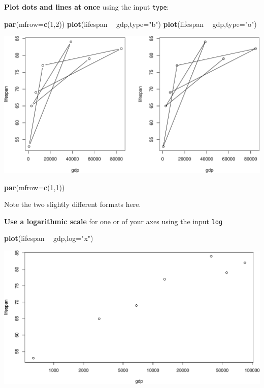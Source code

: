 \documentclass[
]{book}
\newenvironment{Shaded}{\begin{snugshade}}{\end{snugshade}}
\newcommand{\DataTypeTok}[1]{\textcolor[rgb]{0.13,0.29,0.53}{#1}}
\newcommand{\DecValTok}[1]{\textcolor[rgb]{0.00,0.00,0.81}{#1}}
\newcommand{\KeywordTok}[1]{\textcolor[rgb]{0.13,0.29,0.53}{\textbf{#1}}}
\newcommand{\NormalTok}[1]{#1}
\newcommand{\OperatorTok}[1]{\textcolor[rgb]{0.81,0.36,0.00}{\textbf{#1}}}
\newcommand{\StringTok}[1]{\textcolor[rgb]{0.31,0.60,0.02}{#1}}
\begin{document}
\textbf{Plot dots and lines at once} using the input \texttt{type}:

\begin{Shaded}
\begin{Highlighting}[]
\KeywordTok{par}\NormalTok{(}\DataTypeTok{mfrow=}\KeywordTok{c}\NormalTok{(}\DecValTok{1}\NormalTok{,}\DecValTok{2}\NormalTok{))}
\KeywordTok{plot}\NormalTok{(lifespan }\OperatorTok{~}\StringTok{ }\NormalTok{gdp,}\DataTypeTok{type=}\StringTok{"b"}\NormalTok{)}
\KeywordTok{plot}\NormalTok{(lifespan }\OperatorTok{~}\StringTok{ }\NormalTok{gdp,}\DataTypeTok{type=}\StringTok{"o"}\NormalTok{)}
\end{Highlighting}
\end{Shaded}

\includegraphics{figures/unnamed-chunk-113-1.pdf}

\begin{Shaded}
\begin{Highlighting}[]
\KeywordTok{par}\NormalTok{(}\DataTypeTok{mfrow=}\KeywordTok{c}\NormalTok{(}\DecValTok{1}\NormalTok{,}\DecValTok{1}\NormalTok{))}
\end{Highlighting}
\end{Shaded}

Note the two slightly different formats here.

\textbf{Use a logarithmic scale} for one or of your axes using the input \texttt{log}

\begin{Shaded}
\begin{Highlighting}[]
\KeywordTok{plot}\NormalTok{(lifespan }\OperatorTok{~}\StringTok{ }\NormalTok{gdp,}\DataTypeTok{log=}\StringTok{"x"}\NormalTok{)}
\end{Highlighting}
\end{Shaded}

\includegraphics{figures/unnamed-chunk-114-1.pdf}
\end{document}
